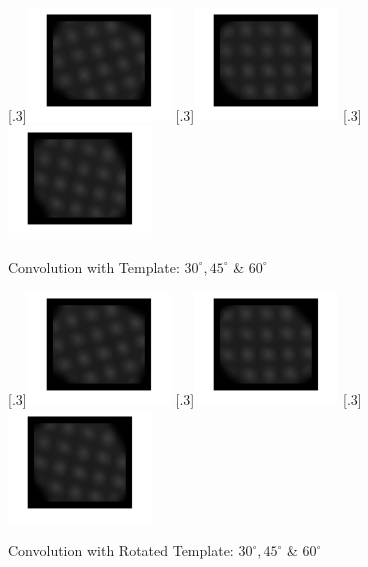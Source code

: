 \documentclass[a4paper]{article}
\begin{document}
	\begin{figure}[H]
		\centering
		[.3\linewidth]{\includegraphics[height=3cm]{Results/Q3/a/qaConv1-30.jpg}}%
		[.3\linewidth]{\includegraphics[height=3cm]{Results/Q3/a/qaConv1-45.jpg}}%
		[.3\linewidth]{\includegraphics[height=3cm]{Results/Q3/a/qaConv1-60.jpg}}%
		\caption{Convolution with Template: $30^\circ, 45^\circ$ \& $60^\circ$}
		\label{fig:}
	\end{figure}
	\begin{figure}[H]
		\centering
		[.3\linewidth]{\includegraphics[height=3cm]{Results/Q3/a/qaConv2-30.jpg}}%
		[.3\linewidth]{\includegraphics[height=3cm]{Results/Q3/a/qaConv2-45.jpg}}%
		[.3\linewidth]{\includegraphics[height=3cm]{Results/Q3/a/qaConv2-60.jpg}}%
		\caption{Convolution with Rotated Template: $30^\circ, 45^\circ$ \& $60^\circ$}
		\label{fig:}
	\end{figure}
\end{document}
